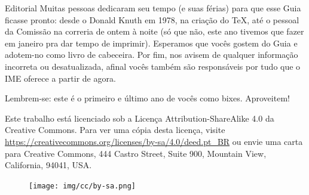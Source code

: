 \begin{editorial}{Editorial}
Muitas pessoas dedicaram seu tempo (e suas férias) para que esse Guia ficasse
pronto: desde o Donald Knuth em 1978, na criação do \TeX\makebox{}, até o
pessoal da Comissão na correria de ontem à noite (só que não, este ano tivemos que 
fazer em janeiro pra dar tempo de imprimir). Esperamos que vocês gostem do Guia
e adotem-no como livro de cabeceira. Por fim, nos avisem de qualquer informação
incorreta ou desatualizada, afinal vocês também são responsáveis por tudo que o
IME oferece a partir de agora.

Lembrem-se: este é o primeiro e último ano de vocês como bixes. Aproveitem!


Este trabalho está licenciado sob a Licença Attribution-ShareAlike 4.0 da
Creative Commons. Para ver uma cópia desta licença, visite
\url{https://creativecommons.org/licenses/by-sa/4.0/deed.pt_BR} ou envie
uma carta para Creative Commons, 444 Castro Street, Suite 900, Mountain View,
California, 94041, USA.
\\
\begin{figure}[H]
    \centering
    \texttt{[image: img/cc/by-sa.png]}
\end{figure}

\end{editorial}
